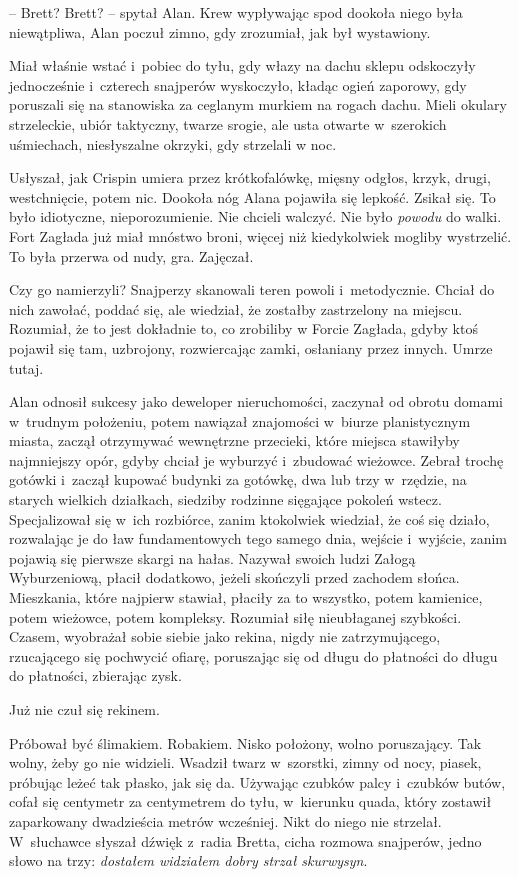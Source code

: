\documentclass[oneside,polish,11pt,sfheadings]{mwbk}
\begin{document}
-- Brett? Brett? -- spytał Alan. Krew wypływając spod dookoła niego była
niewątpliwa, Alan poczuł zimno, gdy zrozumiał, jak był wystawiony.

Miał właśnie wstać i~pobiec do tyłu, gdy włazy na dachu sklepu
odskoczyły jednocześnie i~czterech snajperów wyskoczyło, kładąc ogień
zaporowy, gdy poruszali się na stanowiska za ceglanym murkiem na rogach
dachu. Mieli okulary strzeleckie, ubiór taktyczny, twarze srogie, ale
usta otwarte w~szerokich uśmiechach, niesłyszalne okrzyki, gdy strzelali
w noc.

Usłyszał, jak Crispin umiera przez krótkofalówkę, mięsny odgłos, krzyk,
drugi, westchnięcie, potem nic. Dookoła nóg Alana pojawiła się lepkość. Zsikał
się. To było idiotyczne, nieporozumienie. Nie chcieli walczyć. Nie było
\textit{powodu} do walki. Fort Zagłada już miał mnóstwo broni, więcej niż
kiedykolwiek mogliby wystrzelić. To była przerwa od nudy, gra. Zajęczał.

Czy go namierzyli? Snajperzy skanowali teren powoli i~metodycznie.
Chciał do nich zawołać, poddać się, ale wiedział, że zostałby
zastrzelony na miejscu. Rozumiał, że to jest dokładnie to, co zrobiliby
w Forcie Zagłada, gdyby ktoś pojawił się tam, uzbrojony, rozwiercając
zamki, osłaniany przez innych. Umrze tutaj.

Alan odnosił sukcesy jako deweloper nieruchomości, zaczynał od obrotu
domami w~trudnym położeniu, potem nawiązał znajomości w~biurze
planistycznym miasta, zaczął otrzymywać wewnętrzne przecieki, które
miejsca stawiłyby najmniejszy opór, gdyby chciał je wyburzyć i~zbudować
wieżowce. Zebrał trochę gotówki i~zaczął kupować budynki za gotówkę, dwa
lub trzy w~rzędzie, na starych wielkich działkach, siedziby rodzinne
sięgające pokoleń wstecz. Specjalizował się w~ich rozbiórce, zanim
ktokolwiek wiedział, że coś się działo, rozwalając je do ław
fundamentowych tego samego dnia, wejście i~wyjście, zanim pojawią się
pierwsze skargi na hałas. Nazywał swoich ludzi Załogą Wyburzeniową,
płacił dodatkowo, jeżeli skończyli przed zachodem słońca. Mieszkania,
które najpierw stawiał, płaciły za to wszystko, potem kamienice, potem
wieżowce, potem kompleksy. Rozumiał siłę nieubłaganej szybkości. Czasem,
wyobrażał sobie siebie jako rekina, nigdy nie zatrzymującego,
rzucającego się pochwycić ofiarę, poruszając się od długu do płatności
do długu do płatności, zbierając zysk.

Już nie czuł się rekinem.

Próbował być ślimakiem. Robakiem. Nisko położony, wolno poruszający. Tak
wolny, żeby go nie widzieli. Wsadził twarz w~szorstki, zimny od nocy,
piasek, próbując leżeć tak płasko, jak się da. Używając czubków palcy i~czubków butów, cofał się centymetr za centymetrem do tyłu, w~kierunku
quada, który zostawił zaparkowany dwadzieścia metrów wcześniej. Nikt do
niego nie strzelał. W~słuchawce słyszał dźwięk z~radia Bretta, cicha
rozmowa snajperów, jedno słowo na trzy: \textit{dostałem widziałem dobry
strzał skurwysyn}.
\end{document}
